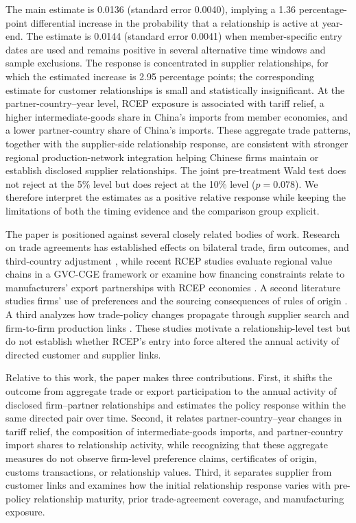 \documentclass[preprint,12pt,authoryear]{elsarticle}
\begin{document}
The main estimate is 0.0136 (standard error 0.0040), implying a 1.36 percentage-point differential increase in the probability that a relationship is active at year-end. The estimate is 0.0144 (standard error 0.0041) when member-specific entry dates are used and remains positive in several alternative time windows and sample exclusions. The response is concentrated in supplier relationships, for which the estimated increase is 2.95 percentage points; the corresponding estimate for customer relationships is small and statistically insignificant. At the partner-country--year level, RCEP exposure is associated with tariff relief, a higher intermediate-goods share in China's imports from member economies, and a lower partner-country share of China's imports. These aggregate trade patterns, together with the supplier-side relationship response, are consistent with stronger regional production-network integration helping Chinese firms maintain or establish disclosed supplier relationships. The joint pre-treatment Wald test does not reject at the 5\% level but does reject at the 10\% level ($p=0.078$). We therefore interpret the estimates as a positive relative response while keeping the limitations of both the timing evidence and the comparison group explicit.

The paper is positioned against several closely related bodies of work. Research on trade agreements has established effects on bilateral trade, firm outcomes, and third-country adjustment \citep{baier2007free,sun2022rtaquality,lee2023thirdcountry}, while recent RCEP studies evaluate regional value chains in a GVC-CGE framework \citep{sun2023estimating} or examine how financing constraints relate to manufacturers' export partnerships with RCEP economies \citep{peng2025financing}. A second literature studies firms' use of preferences and the sourcing consequences of rules of origin \citep{hayakawa2023firm,tanaka2022rooexports,head2024laffer}. A third analyzes how trade-policy changes propagate through supplier search and firm-to-firm production links \citep{garg2023within,grossman2024tariffs}. These studies motivate a relationship-level test but do not establish whether RCEP's entry into force altered the annual activity of directed customer and supplier links.

Relative to this work, the paper makes three contributions. First, it shifts the outcome from aggregate trade or export participation to the annual activity of disclosed firm--partner relationships and estimates the policy response within the same directed pair over time. Second, it relates partner-country--year changes in tariff relief, the composition of intermediate-goods imports, and partner-country import shares to relationship activity, while recognizing that these aggregate measures do not observe firm-level preference claims, certificates of origin, customs transactions, or relationship values. Third, it separates supplier from customer links and examines how the initial relationship response varies with pre-policy relationship maturity, prior trade-agreement coverage, and manufacturing exposure.
\end{document}
